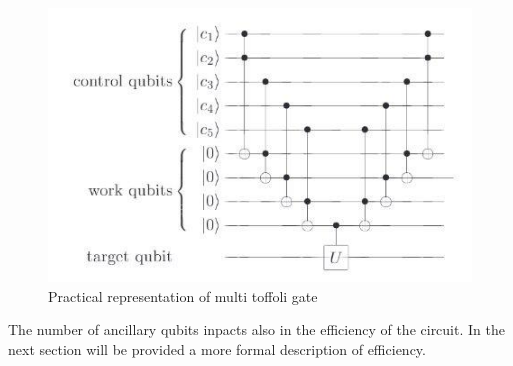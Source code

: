 \begin{figure}[h!]
    \includegraphics[scale=0.5]{img/ancillary.jpg}
    \caption{Practical representation of multi toffoli gate}
    \centering
\end{figure}

The number of ancillary qubits inpacts also in the efficiency of the circuit. In the next
section will be provided a more formal description of efficiency.
